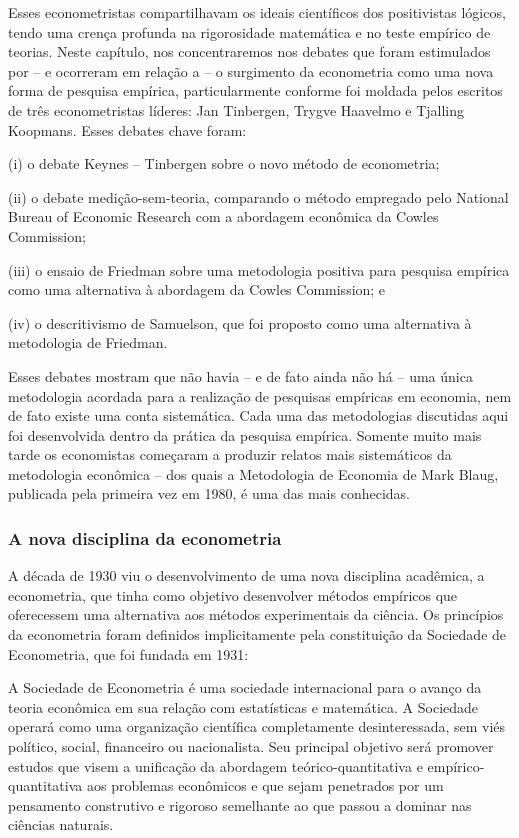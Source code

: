 \documentclass[12pt]{article}
\begin{document}
Esses econometristas compartilhavam os ideais científicos dos positivistas lógicos,
tendo uma crença profunda na rigorosidade matemática e no teste empírico
de teorias. Neste capítulo, nos concentraremos nos debates que foram
estimulados por – e ocorreram em relação a – o surgimento da econometria
como uma nova forma de pesquisa empírica, particularmente conforme foi moldada
pelos escritos de três econometristas líderes: Jan Tinbergen, Trygve
Haavelmo e Tjalling Koopmans. Esses debates chave foram:

(i) o debate Keynes – Tinbergen sobre o novo método de econometria;

(ii) o debate medição-sem-teoria, comparando o método
empregado pelo National Bureau of Economic Research com a
abordagem econômica da Cowles Commission;

(iii) o ensaio de Friedman sobre uma metodologia positiva para pesquisa empírica
como uma alternativa à abordagem da Cowles Commission; e

(iv) o descritivismo de Samuelson, que foi proposto como uma alternativa à
metodologia de Friedman.

Esses debates mostram que não havia – e de fato ainda não há – uma única metodologia acordada para a realização de pesquisas empíricas em economia, nem de fato existe uma conta sistemática. Cada uma das metodologias discutidas aqui foi desenvolvida dentro da prática da pesquisa empírica. Somente muito mais tarde os economistas começaram a produzir relatos mais sistemáticos da metodologia econômica – dos quais a Metodologia de Economia de Mark Blaug, publicada pela primeira vez em 1980, é uma das mais conhecidas.

\subsubsection{\textbf{A nova disciplina da econometria}}
A década de 1930 viu o desenvolvimento de uma nova disciplina acadêmica, a econometria, que tinha como objetivo desenvolver métodos empíricos que oferecessem uma alternativa aos métodos experimentais da ciência. Os princípios da econometria foram definidos implicitamente pela constituição da Sociedade de Econometria, que foi fundada em 1931:

A Sociedade de Econometria é uma sociedade internacional para o avanço da teoria econômica em sua relação com estatísticas e matemática. A Sociedade operará como uma organização científica completamente desinteressada, sem viés político, social, financeiro ou nacionalista. Seu principal objetivo será promover estudos que visem a unificação da abordagem teórico-quantitativa e empírico-quantitativa aos problemas econômicos e que sejam penetrados por um pensamento construtivo e rigoroso semelhante ao que passou a dominar nas ciências naturais.
\end{document}
